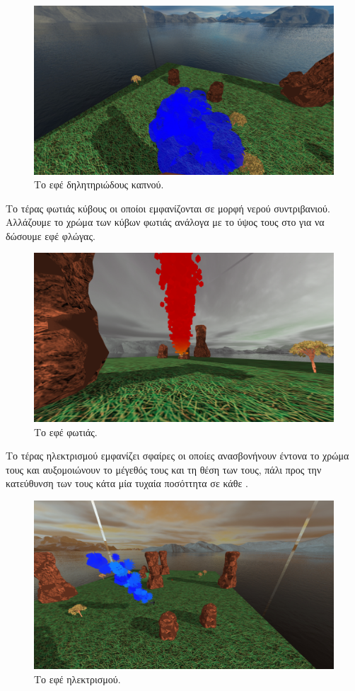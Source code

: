 \documentclass[11pt]{scrartcl} %
\newenvironment{centerimg}[1]%
{%
    \begin{figure}[H]
        #1
    \begin{center}
}%
{%
    \end{center}
    \end{figure}
}
\begin{document}
\begin{centerimg}{\caption{Το εφέ δηλητηριώδους καπνού.}}
    \includegraphics[width=.7\textwidth]{./assets/poison_smoke.png}
\end{centerimg}

Το τέρας φωτιάς  κύβους οι οποίοι εμφανίζονται σε μορφή 
νερού συντριβανιού. Αλλάζουμε το χρώμα των κύβων φωτιάς ανάλογα με το ύψος τους στο 
 για να δώσουμε εφέ φλώγας.

\begin{centerimg}{\caption{Το εφέ φωτιάς.}}
    \includegraphics[width=.7\textwidth]{./assets/fire.png}
\end{centerimg}


Το τέρας ηλεκτρισμού εμφανίζει σφαίρες οι οποίες ανασβονήνουν έντονα το χρώμα 
τους και αυξομοιώνουν  το μέγεθός τους και τη θέση των  
τους, πάλι προς την κατεύθυνση των  τους κάτα μία τυχαία ποσόττητα 
σε κάθε .

\begin{centerimg}{\caption{Το εφέ ηλεκτρισμού.}}
    \includegraphics[width=.7\textwidth]{./assets/electricity.png}
\end{centerimg}
\end{document}
